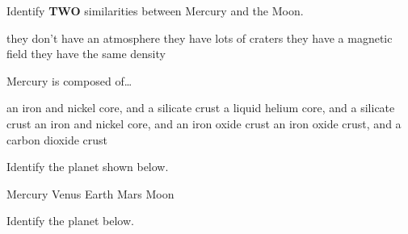 \documentclass{exam}
\begin{document}
\begin{questions}

\question
Identify \textbf{TWO} similarities between Mercury and the Moon.

\begin{randomizechoices}
    \correctchoice they don't have an atmosphere
    \correctchoice they have lots of craters
    \choice they have a magnetic field
    \choice they have the same density
\end{randomizechoices}

\question 
Mercury is composed of\ldots

\begin{randomizechoices}
    \correctchoice an iron and nickel core, and a silicate crust
    \choice a liquid helium core, and a silicate crust
    \choice an iron and nickel core, and an iron oxide crust
    \choice an iron oxide crust, and a carbon dioxide crust
\end{randomizechoices}

\question
Identify the planet shown below.

\begin{center}
\end{center}

\begin{randomizechoices}
    \correctchoice Mercury
    \choice Venus
    \choice Earth
    \choice Mars
    \choice Moon
\end{randomizechoices}

\question
Identify the planet below.

\begin{center}
\end{center}


\end{questions}
\end{document}
